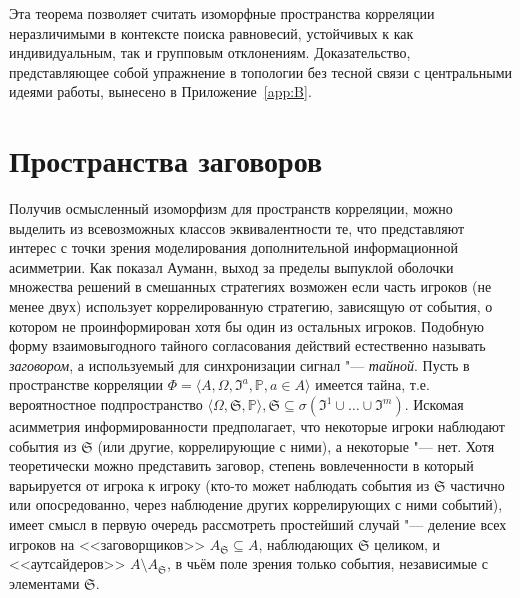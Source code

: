 Эта теорема позволяет считать изоморфные пространства корреляции неразличимыми в контексте поиска равновесий, устойчивых к как индивидуальным, так и групповым отклонениям. Доказательство, представляющее собой упражнение в топологии без тесной связи с центральными идеями работы, вынесено в Приложение~\cref{app:B}.

\section{Пространства заговоров}\label{sec:ch1/sec3}

Получив осмысленный изоморфизм для пространств корреляции, можно выделить из всевозможных классов эквивалентности те, что представляют интерес с точки зрения моделирования дополнительной информационной асимметрии. Как показал Ауманн, выход за пределы выпуклой оболочки множества решений в смешанных стратегиях возможен если часть игроков (не менее двух) использует коррелированную стратегию, зависящую от события, о котором не проинформирован хотя бы один из остальных игроков. Подобную форму взаимовыгодного тайного согласования действий естественно называть \emph{заговором}, а используемый для синхронизации сигнал "--- \emph{тайной}. Пусть в пространстве корреляции $\Phi = \langle A, \Omega, \mathfrak{I}^a, \mathbb{P}, a \in A \rangle$ имеется тайна, т.е. вероятностное подпространство $\langle \Omega, \mathfrak{S}, \mathbb{P} \rangle, \mathfrak{S} \subseteq \sigma(\mathfrak{I}^1 \cup \ldots \cup \mathfrak{I}^m)$. Искомая асимметрия информированности предполагает, что некоторые игроки наблюдают события из $\mathfrak{S}$ (или другие, коррелирующие с ними), а некоторые "--- нет. Хотя теоретически можно представить заговор, степень вовлеченности в который варьируется от игрока к игроку (кто-то может наблюдать события из $\mathfrak{S}$ частично или опосредованно, через наблюдение других коррелирующих с ними событий), имеет смысл в первую очередь рассмотреть простейший случай "--- деление всех игроков на <<заговорщиков>> $A_{\mathfrak{S}} \subseteq A$, наблюдающих $\mathfrak{S}$ целиком, и <<аутсайдеров>> $A \setminus A_{\mathfrak{S}}$, в чьём поле зрения только события, независимые с элементами $\mathfrak{S}$.


